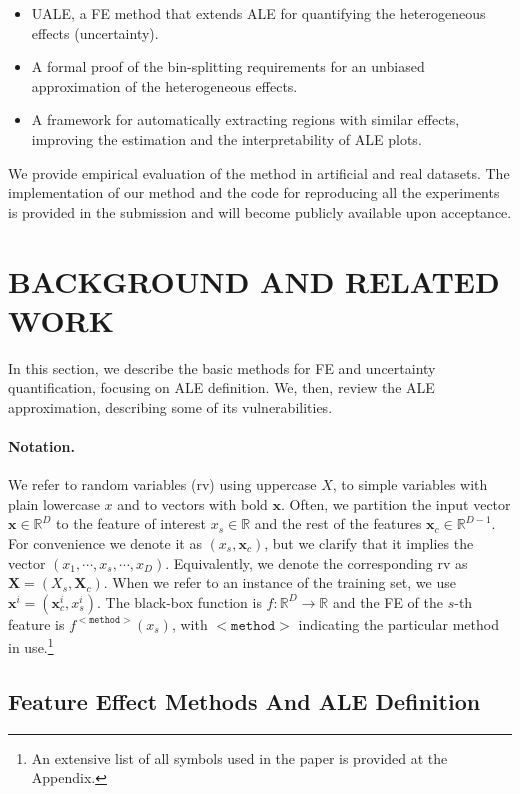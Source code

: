 \documentclass[twoside]{article}
\newcommand{\xc}{\mathbf{x}_c}
\newcommand{\xb}{\mathbf{x}}
\begin{document}
\begin{itemize}
\item UALE, a FE method that extends ALE for quantifying the
  heterogeneous effects (uncertainty).
\item A formal proof of the bin-splitting requirements for an unbiased
  approximation of the heterogeneous effects.
\item A framework for automatically extracting regions with similar
  effects, improving the estimation and the interpretability of ALE
  plots.
\end{itemize}

We provide empirical evaluation of the method in artificial and real
datasets. The implementation of our method and the code for
reproducing all the experiments is provided in the submission and will
become publicly available upon acceptance.


\section{BACKGROUND AND RELATED WORK}

In this section, we describe the basic methods for FE and uncertainty
quantification, focusing on ALE definition. We, then, review the ALE
approximation\citep{apley2020visualizing, gkolemis22}, describing some
of its vulnerabilities.

\paragraph{Notation.} We refer to random variables (rv) using
uppercase \( X \), to simple variables with plain lowercase \( x \)
and to vectors with bold \( \xb \). Often, we partition the input
vector \(\xb \in \mathbb{R}^D\) to the feature of interest
\(x_s \in \mathbb{R} \) and the rest of the features
\(\xc \in \mathbb{R}^{D-1}\). For convenience we denote it as
\((x_s, \mathbf{x}_c)\), but we clarify that it implies the vector
\((x_1, \cdots , x_s, \cdots, x_D)\). Equivalently, we denote the
corresponding rv as \(\mathbf{X} = (X_s, \mathbf{X}_c)\). When we
refer to an instance of the training set, we use
\(\xb^i= (\xc^i, x_s^i) \). The black-box function is
\(f : \mathbb{R}^D \rightarrow \mathbb{R}\) and the FE of the \(s\)-th
feature is \(f^{\mathtt{<method>}}(x_s)\), with \(\mathtt{<method>}\)
indicating the particular method in use.\footnote{An extensive list of all
  symbols used in the paper is provided at the Appendix.}

\subsection{Feature Effect Methods And ALE Definition}
\label{sec:feat-effect-meth}
\end{document}
